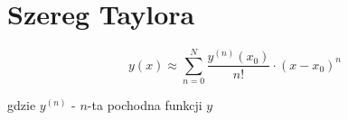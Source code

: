 \section*{Szereg Taylora}

\begin{equation*}
    y(x) \approx \sum_{n = 0}^{N} \frac{y^{(n)}(x_0)}{n!}
    \cdot (x-x_0)^n
\end{equation*}

gdzie $y^{(n)}$ - $n$-ta pochodna funkcji $y$